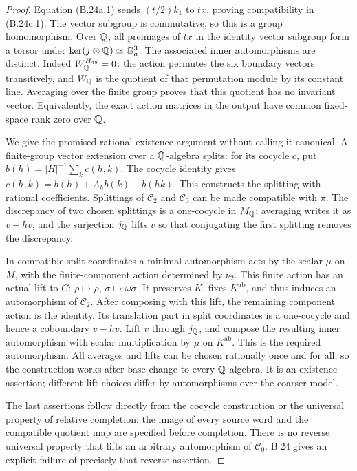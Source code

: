 \begin{proof}
Equation (B.24a.1) sends $(t/2)k_1$ to $t x$, proving compatibility
in (B.24c.1).  The vector subgroup is commutative, so this is a group
homomorphism.  Over $\mathbb Q$, all preimages of $t x$ in the identity
vector subgroup form a torsor under
$\ker(j\otimes\mathbb Q)\simeq\mathbb G_a^3$.  The associated inner automorphisms
are distinct.  Indeed $W_\mathbb Q^{H_{48}}=0$: the action permutes the six
boundary vectors transitively, and $W_\mathbb Q$ is the quotient of that
permutation module by its constant line.  Averaging over the finite
group proves that this quotient has no invariant vector.  Equivalently,
the exact action matrices in the output have common fixed-space rank
zero over $\mathbb Q$.

We give the promised rational existence argument without calling it
canonical.  A finite-group vector extension over a $\mathbb Q$-algebra splits:
for its cocycle $c$, put
$b(h)=|H|^{-1}\sum_k c(h,k)$.  The cocycle identity gives
$c(h,k)=b(h)+A_hb(k)-b(hk)$.  This constructs the splitting with
rational coefficients.  Splittings of $\mathscr C_2$ and
$\mathscr C_0$ can be made compatible with $\pi$.  The discrepancy
of two chosen splittings is a one-cocycle in $M_\mathbb Q$; averaging writes
it as $v-hv$, and the surjection $j_\mathbb Q$ lifts $v$ so that conjugating
the first splitting removes the discrepancy.

In compatible split coordinates a minimal automorphism acts by the
scalar $\mu$ on $M$, with the finite-component action determined by
$\nu_2$.  This finite action has an actual lift to $C$:
$\rho\mapsto\rho$, $\sigma\mapsto\omega\sigma$.
It preserves $K$, fixes $K^{\mathrm{ab}}$, and thus induces an
automorphism of $\mathscr C_2$.  After composing with this lift,
the remaining component action is the identity.  Its translation
part in split coordinates is a one-cocycle and hence a coboundary
$v-hv$.  Lift $v$ through $j_\mathbb Q$, and compose the resulting inner
automorphism with scalar multiplication by $\mu$ on $K^{\mathrm{ab}}$.
This is the required automorphism.  All averages and lifts can be
chosen rationally once and for all, so the construction works after
base change to every $\mathbb Q$-algebra.  It is an existence assertion;
different lift choices differ by automorphisms over the coarser model.

The last assertions follow directly from the cocycle construction or
the universal property of relative completion: the image of every
source word and the compatible quotient map are specified before
completion.  There is no reverse universal property that lifts an
arbitrary automorphism of $\mathscr C_0$.  B.24 gives an explicit
failure of precisely that reverse assertion.
\end{proof}

